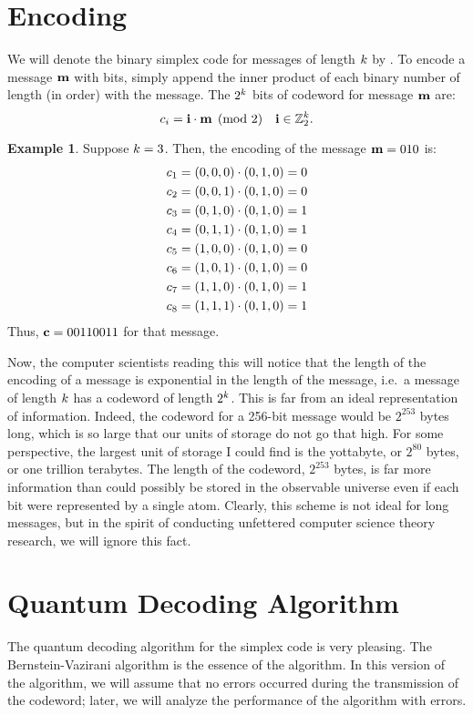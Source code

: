 \documentclass[12pt,twoside]{reedthesis}
\theoremstyle{definition}
\newtheorem{example}[theorem]{Example}
\newcommand{\Z}{\mathbb{Z}}
\begin{document}
\section{Encoding}
We will denote the binary simplex code for messages of length $k$ by \simpl{\mlen}. To encode a message $\mathbf{m}$ with \mlen bits, simply append the inner product of each binary number of length \mlen (in order) with the message. The $2^k$ bits of codeword \cw for message $\mathbf{m}$ are: 
\begin{equation*}
\cwb{i}= \mathbf{i} \cdot \mess \pmod{2} \quad{\mathbf{i} \in \Z_2^\mlen}.
\end{equation*}
\begin{example}
Suppose $k=3$. Then, the encoding of the message $\mathbf{m} = 010$ is:
\begin{align*}
&c_{1} = (0,0,0) \cdot (0,1,0) = 0\\
&c_{2} = (0,0,1) \cdot (0,1,0) = 0\\
&c_{3} = (0,1,0) \cdot (0,1,0) = 1\\
&c_{4} = (0,1,1) \cdot (0,1,0) = 1\\
&c_{5} = (1,0,0) \cdot (0,1,0) = 0\\
&c_{6} = (1,0,1) \cdot (0,1,0) = 0\\
&c_{7} = (1,1,0) \cdot (0,1,0) = 1\\
&c_{8} = (1,1,1) \cdot (0,1,0) = 1\\
\end{align*}
Thus, $\mathbf{c} = 00110011$ for that message. 
\end{example}
Now, the computer scientists reading this will notice that the length of the encoding of a message is exponential in the length of the message, i.e.~a message of length $k$ has a codeword of length $2^k$. This is far from an ideal representation of information. Indeed, the codeword for a 256-bit message would be $2^{253}$ bytes long, which is so large that our units of storage do not go that high. For some perspective, the largest unit of storage I could find is the yottabyte, or $2^{80}$ bytes, or one trillion terabytes. The length of the codeword, $2^{253}$ bytes, is far more information than could possibly be stored in the observable universe even if each bit were represented by a single atom. Clearly, this scheme is not ideal for long messages, but in the spirit of conducting unfettered computer science theory research, we will ignore this fact. 

\section{Quantum Decoding Algorithm}
The quantum decoding algorithm for the simplex code is very pleasing. The Bernstein-Vazirani algorithm is the essence of the algorithm. In this version of the algorithm, we will assume that no errors occurred during the transmission of the codeword; later, we will analyze the performance of the algorithm with errors.
\end{document}
